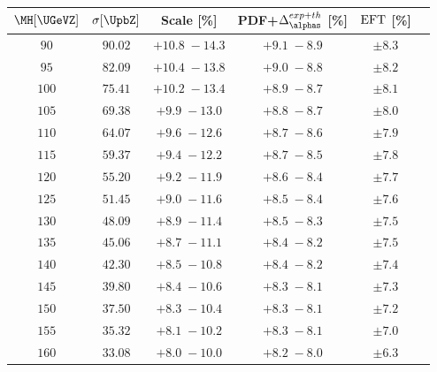 \begin{table}[!h]

   \begin{center}
    \small
    \begin{tabular}{cccccc}\hline
    $\MH[\UGeVZ]$ & $\sigma[\UpbZ]$  & Scale [\%] &  PDF+$\Delta^{exp+th}_{\alphas}$  [\%]  & ${\rm EFT}$  [\%] \\ \hline
$90$  & $90.02$ & ${+10.8 \; -14.3}$ & ${ +9.1\; -8.9}$ & ${\pm 8.3} $  \\  
$95$  & $82.09$ & ${+10.4 \; -13.8}$ & ${ +9.0\; -8.8}$ & ${\pm 8.2} $  \\  
$100$ & $75.41$ & ${+10.2 \; -13.4}$ & ${ +8.9\; -8.7}$ & ${\pm 8.1} $  \\  
$105$ & $69.38$ & ${+9.9 \; -13.0 }$ & ${ +8.8\; -8.7}$ & ${\pm 8.0} $  \\  
$110$ & $64.07$ & ${+9.6 \; -12.6 }$ & ${ +8.7\; -8.6}$ & ${\pm 7.9} $  \\  
$115$ & $59.37$ & ${+9.4 \; -12.2 }$ & ${ +8.7\; -8.5}$ & ${\pm 7.8} $  \\  
$120$ & $55.20$ & ${+9.2 \; -11.9 }$ & ${ +8.6\; -8.4}$ & ${\pm 7.7} $  \\  
$125$ & $51.45$ & ${+9.0 \; -11.6 }$ & ${ +8.5\; -8.4}$ & ${\pm 7.6 } $  \\  
$130$ & $48.09$ & ${+8.9 \; -11.4 }$ & ${ +8.5\; -8.3}$ & ${\pm 7.5 } $  \\  
$135$ & $45.06$ & ${+8.7 \; -11.1 }$ & ${ +8.4\; -8.2}$ & ${\pm 7.5 } $  \\  
$140$ & $42.30$ & ${+8.5 \; -10.8 }$ & ${ +8.4\; -8.2}$ & ${\pm 7.4 } $  \\  
$145$ & $39.80$ & ${+8.4 \; -10.6 }$ & ${ +8.3\; -8.1}$ & ${\pm 7.3 } $ \\  
$150$ & $37.50$ & ${+8.3 \; -10.4 }$ & ${ +8.3\; -8.1}$ & ${\pm 7.2 } $  \\  
$155$ & $35.32$ & ${+8.1 \; -10.2 }$ & ${ +8.3\; -8.1}$ & ${\pm 7.0 } $ \\  
$160$ & $33.08$ & ${+8.0 \; -10.0 }$ & ${ +8.2\; -8.0}$ & ${\pm 6.3 } $  \\  

\end{tabular}
\end{center}
\end{table}
